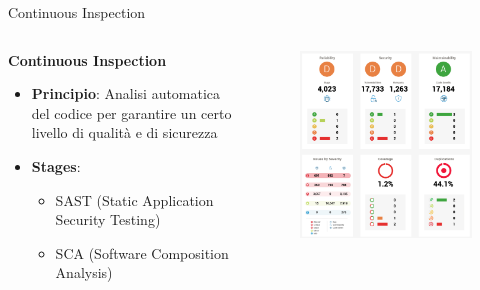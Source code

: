 \begin{frame}{Continuous Inspection}
        \begin{columns}[onlytextwidth]
        \begin{column}{0.45\textwidth}
            \textbf{Continuous Inspection}
            \vspace{2mm}
            \begin{itemize}
                \item \textbf{Principio}: Analisi automatica del codice per garantire un certo livello di qualità e di sicurezza
                \vspace{2mm}
                \item \textbf{Stages}:
                \begin{itemize}
                    \item SAST (Static Application Security Testing)
                    \item SCA (Software Composition Analysis)
                \end{itemize}
            \end{itemize}
        \end{column}
        \begin{column}{0.5\textwidth}
            \begin{figure}[H]
                \includegraphics[width=1\textwidth]{img/sonar-screenshot.png}
            \end{figure}
        \end{column}
    \end{columns}
\end{frame}

